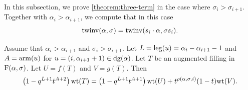 In this subsection, we prove \cref{theorem:three-term} in the case where \(\sigma_i > \sigma_{i+1}\).
Together with \(\alpha_i > \alpha_{i+1}\), we compute that in this case
\begin{equation*}
    \operatorname{twinv}(\alpha, \sigma) = \operatorname{twinv}(s_i \cdot \alpha, \sigma s_i).
\end{equation*}

\begin{lemma} \label{lem:three-term-bijective-a}
    Assume that \(\alpha_i > \alpha_{i+1}\) and \(\sigma_i > \sigma_{i+1}\).
    Let \(L = \operatorname{leg}(u) = \alpha_i - \alpha_{i+1} - 1\) and \(A = \operatorname{arm}(u)\) for \(u = (i, \alpha_{i+1} + 1) \in \dg(\alpha)\).
    Let \(T\) be an augmented filling in \(\Fill(\alpha, \sigma)\).
    Let \(U = f(T)\) and \(V = g(T)\).
    Then
    \begin{equation} \label{eq:three-term-bijective-a}
        \left( 1 - q^{L+1} t^{A + 2} \right) \wt(T)
        =
        \left( 1 - q^{L+1} t^{A + 1} \right) \wt(U)
        +
        t^{\rho(\alpha,\sigma,i)} (1 - t) \wt(V).
    \end{equation}
\end{lemma}
